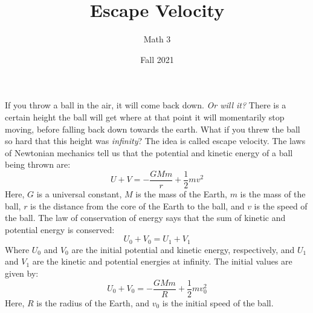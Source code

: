 \documentclass{article}
\title{Escape Velocity}
\author{Math 3}
\date{Fall 2021}
\begin{document}
    \maketitle
    If you throw a ball in the air, it will come back down.
    \textit{Or will it?} There is a certain height the ball will get
    where at that point it will momentarily stop moving, before
    falling back down towards the earth. What if you threw the ball so hard
    that this height was \textit{infinity}? The idea is called escape velocity.
    The laws of Newtonian mechanics tell us that the potential and kinetic
    energy of a ball being thrown are:
    \begin{equation}
        U+V=-\frac{GMm}{r}+\frac{1}{2}mv^{2}
    \end{equation}
    Here, $G$ is a universal constant, $M$ is the mass of the Earth, $m$ is the
    mass of the ball, $r$ is the distance from the core of the Earth to the
    ball, and $v$ is the speed of the ball. The law of conservation of energy
    says that the sum of kinetic and potential energy is conserved:
    \begin{equation}
        U_{0}+V_{0}=U_{1}+V_{1}
    \end{equation}
    Where $U_{0}$ and $V_{0}$ are the initial potential and kinetic energy,
    respectively, and $U_{1}$ and $V_{1}$ are the kinetic
    and potential energies at infinity. The initial values are given by:
    \begin{equation}
        U_{0}+V_{0}=-\frac{GMm}{R}+\frac{1}{2}mv_{0}^{2}
    \end{equation}
    Here, $R$ is the radius of the Earth, and $v_{0}$ is the initial speed of
    the ball.
    \par\hfill\par
\end{document}
